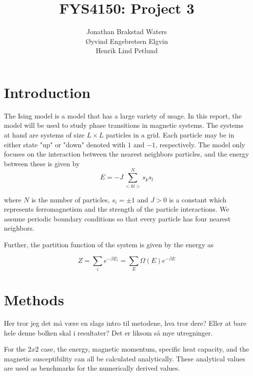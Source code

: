 \documentclass[12pt,english,a4paper]{article}
\title{FYS4150: Project 3}
\author{Jonathan Brakstad Waters\\Øyvind Engebretsen Elgvin\\Henrik Lind Petlund}
\begin{document}
\begin{titlepage}
\maketitle
\begin{abstract}
    
\end{abstract}

\end{titlepage}

\section{Introduction}

The Ising model is a model that has a large variety of usage. In this report, the model will be used to study phase transitions in magnetic systems. The systems at hand are systems of size $L\times L$ particles in a grid. Each particle may be in either state "up" or "down" denoted with $1$ and $-1$, respectively. The model only focuses on the interaction between the nearest neighbors particles, and the energy between these is given by
$$
E=-J\sum_{<kl>}^{N}s_ks_l \label{eq:1}
$$

where $N$ is the number of particles, $s_i=\pm 1$ and $J>0$ is a constant which represents ferromagnetism and the strength of the particle interactions. We assume periodic boundary conditions so that every particle has four nearest neighbors. 

Further, the partition function of the system is given by the energy as

$$
Z=\sum_i e^{-\beta E_i} = \sum_E \Omega (E) e^{-\beta E} \label{eq:2}
$$


\vfill

\section{Methods}

Her tror jeg det må være en slags intro til metodene, hva tror dere? 
Eller at bare hele denne bolken skal i resultater? Det er liksom så mye utregninger. 

\vfill

For the $2x2$ case, the energy, magnetic momentum, specific heat capacity, and the magnetic susceptibility can all be calculated analytically. These analytical values are used as benchmarks for the numerically derived values. 
\end{document}
